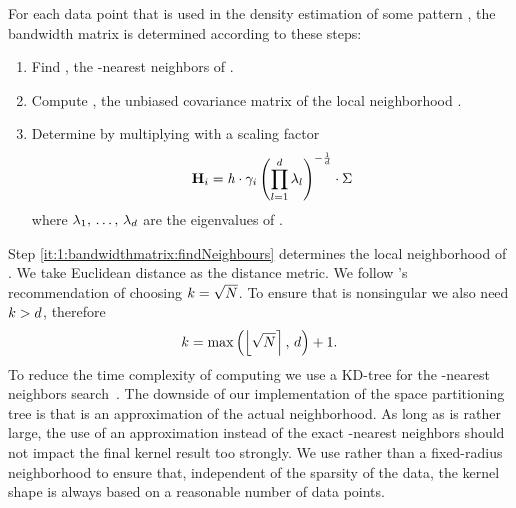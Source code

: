 	For each data point \varPattern[\itXis] that is used in the density estimation of some pattern \varPattern[\itXs], the bandwidth matrix is determined according to these steps:
		\begin{enumerate}[labelindent=0ex]
			\item \label{it:1:bandwidthmatrix:findNeighbours}
				Find \varNeighborhood{\varPattern[\itXis]}, the \KNNK-nearest neighbors of \varPattern[\itXis].
			\item \label{it:1:bandwidthmatrix:initialBandwidthMatrix}
				Compute \varCovarianceMatrix, the unbiased covariance matrix of the local neighborhood \varNeighborhood{\varPattern[\itXis]}.
			\item \label{it:1:bandwidthmatrix:scaleBandwidhtMatrix}
				Determine \varBandwidthMatrix[\itXis] by multiplying \varCovarianceMatrix with a scaling factor
				\begin{equation}\label{eq:method:scalingFactor}
					\varBandwidthMatrix[\itXis] = \varBandwidth \cdot \varLocalBandwidth{\itXis}
				 \left( \displaystyle\prod_{\itDim = 1}^{\varDim} \varEigenValue_\itDim \right)^{-\frac{1}{\varDim}} \cdot \varCovarianceMatrix
				\end{equation}
				where $\lambda_1,\, \dotsc,\, \lambda_d$ are the eigenvalues of \varCovarianceMatrix.
		\end{enumerate}
		Step \ref{it:1:bandwidthmatrix:findNeighbours} determines the local neighborhood of \varPattern[\itXis]. We take Euclidean distance as the distance metric.
		We follow \citeauthor{silverman1986density}'s~\cite{silverman1986density} recommendation of choosing $k = \sqrt{N}$. To ensure that \varCovarianceMatrix is nonsingular we also need $k > d$, therefore
		\begin{equation}\label{eq:method:k}
			k = \max\left(\left\lfloor \sqrt{N} \right\rceil,\, d \right) + 1.
		\end{equation}
		To reduce the time complexity of computing \varBandwidthMatrix[\itXis]we use a KD-tree for the \KNNK-nearest neighbors search~\cite{Bentley1975Multidimensional}. The downside of our implementation of the space partitioning tree is that \varNeighborhood{\varPattern[\itXis]} is an approximation of the actual neighborhood. As long as \KNNK is rather large, the use of an approximation instead of the exact \KNNK-nearest neighbors should not impact the final kernel result too strongly.
		We use \KNN rather than a fixed-radius neighborhood to ensure that, independent of the sparsity of the data, the kernel shape is always based on a reasonable number of data points.

